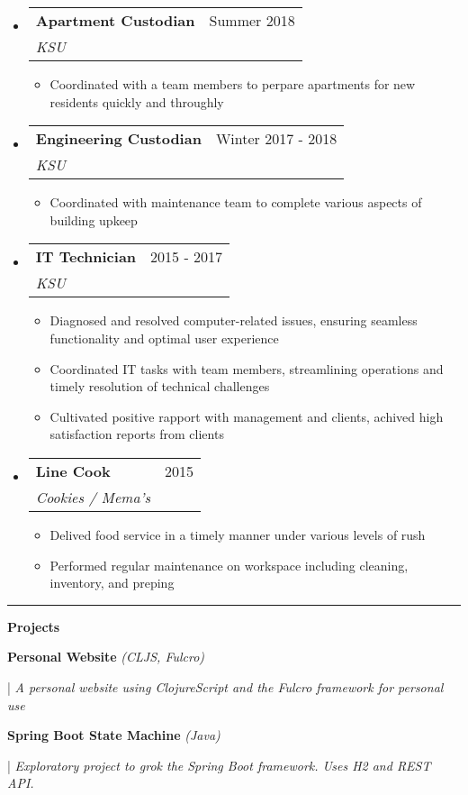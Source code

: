 \documentclass[letterpaper,11pt]{article}
\makeatletter
\newcommand{\resumeItem}[1]{
  \item\small{
    {#1 \vspace{-2pt}}
  }
}
\newcommand{\resumeSubheading}[4]{
  \vspace{-2pt}\item
    \begin{tabular*}{0.97\textwidth}[t]{l@{\extracolsep{\fill}}r}
      \textbf{#1} & #2 \\
      \textit{\small#3} & \textit{\small #4} \\
    \end{tabular*}\vspace{0pt}
}
\newcommand{\resumeSubHeadingListStart}{\begin{itemize}[leftmargin=0.15cm, label={}]}
\newcommand{\resumeSubHeadingListEnd}{\end{itemize}}
\newcommand{\resumeItemListStart}{\begin{itemize}}
\newcommand{\resumeItemListEnd}{\end{itemize}\vspace{-5pt}}
\makeatother
\begin{document}
\resumeSubHeadingListStart
\resumeSubheading
{Apartment Custodian}{Summer 2018}
{KSU}{}
\resumeItemListStart
\resumeItem{ Coordinated with a team members to perpare apartments for new residents quickly and throughly }
\resumeItemListEnd
\resumeSubHeadingListEnd

\newpage

\resumeSubHeadingListStart
\resumeSubheading
{Engineering Custodian}{Winter 2017 - 2018}
{KSU}{}
\resumeItemListStart
\resumeItem{ Coordinated with maintenance team to complete various aspects of building upkeep }
\resumeItemListEnd
\resumeSubHeadingListEnd

\resumeSubHeadingListStart
\resumeSubheading
{IT Technician}{2015 - 2017}
{KSU}{}
\resumeItemListStart
\resumeItem{ Diagnosed and resolved computer-related issues, ensuring seamless functionality and optimal user experience }
\resumeItem{ Coordinated IT tasks with team members, streamlining operations and timely resolution of technical challenges }
\resumeItem{ Cultivated positive rapport with management and clients, achived high satisfaction reports from clients }
\resumeItemListEnd
\resumeSubHeadingListEnd

\resumeSubHeadingListStart
\resumeSubheading
{Line Cook}{2015}
{Cookies / Mema's}{}
\resumeItemListStart
\resumeItem{ Delived food service in a timely manner under various levels of rush }
\resumeItem{ Performed regular maintenance on workspace including cleaning, inventory, and preping }
\resumeItemListEnd
\resumeSubHeadingListEnd


\noindent\rule{19.5cm}{0.4pt}

\textbf{\large \textcolor{magic_blue}{Projects}}


\begin{minipage}[t]{0.28\textwidth}
	\raggedright
	\textbf{ Personal Website }\textit{(CLJS, Fulcro)} \\
\end{minipage}
\hfill
\begin{minipage}[t]{0.70\textwidth}
	\raggedright
	|\textit{ A personal website using ClojureScript and the Fulcro framework for personal use} \\
\end{minipage}

\begin{minipage}[t]{0.28\textwidth}
	\raggedright
	\textbf{ Spring Boot State Machine }\textit{(Java)} \\
\end{minipage}
\hfill
\begin{minipage}[t]{0.70\textwidth}
	\raggedright
	|\textit{ Exploratory project to grok the Spring Boot framework. Uses H2 and REST API.} \\
\end{minipage}
\end{document}
